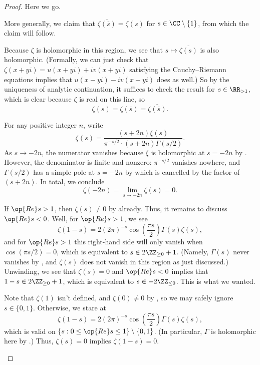 \documentclass[../notes.tex]{subfiles}
\begin{document}
\begin{proof}
	Here we go.
	\begin{listalph}
		\item More generally, we claim that $\overline{\zeta(\overline s)}=\zeta(s)$ for $s\in\CC\setminus\{1\}$, from which the claim will follow.
		
		Because $\zeta$ is holomorphic in this region, we see that $s\mapsto\overline{\zeta(s)}$ is also holomorphic. (Formally, we can just check that $\zeta(x+yi)=u(x+yi)+iv(x+yi)$ satisfying the Cauchy--Riemann equations implies that $u(x-yi)-iv(x-yi)$ does as well.) So by the uniqueness of analytic continuation, it suffices to check the result for $s\in\RR_{>1}$, which is clear because $\zeta$ is real on this line, so
		\[\zeta(s)=\zeta(\overline s)=\overline{\zeta(\overline s)}.\]

		\item For any positive integer $n$, write
		\[\zeta(s)=\frac{(s+2n)\xi(s)}{\pi^{-s/2}\cdot(s+2n)\Gamma(s/2)}.\]
		As $s\to-2n$, the numerator vanishes because $\xi$ is holomorphic at $s=-2n$ by . However, the denominator is finite and nonzero: $\pi^{-s/2}$ vanishes nowhere, and $\Gamma(s/2)$ has a simple pole at $s=-2n$ by  which is cancelled by the factor of $(s+2n)$. In total, we conclude
		\[\zeta(-2n)=\lim_{s\to-2n}\zeta(s)=0.\]

		\item If $\op{Re}s>1$, then $\zeta(s)\ne0$ by  already. Thus, it remains to discuss $\op{Re}s<0$. Well, for $\op{Re}s>1$, we see
		\[\zeta(1-s)=2(2\pi)^{-s}\cos\left(\frac{\pi s}2\right)\Gamma(s)\zeta(s),\]
		and for $\op{Re}s>1$ this right-hand side will only vanish when $\cos(\pi s/2)=0$, which is equivalent to $s\in2\ZZ_{\ge0}+1$. (Namely, $\Gamma(s)$ never vanishes by , and $\zeta(s)$ does not vanish in this region as just discussed.) Unwinding, we see that $\zeta(s)=0$ and $\op{Re}s<0$ implies that $1-s\in2\ZZ_{\ge0}+1$, which is equivalent to $s\in-2\ZZ_{\le0}$. This is what we wanted.

		\item Note that $\zeta(1)$ isn't defined, and $\zeta(0)\ne0$ by , so we may safely ignore $s\in\{0,1\}$. Otherwise, we stare at
		\[\zeta(1-s)=2(2\pi)^{-s}\cos\left(\frac{\pi s}2\right)\Gamma(s)\zeta(s),\]
		which is valid on $\{s:0\le\op{Re}s\le1\}\setminus\{0,1\}$. (In particular, $\Gamma$ is holomorphic here by .) Thus, $\zeta(s)=0$ implies $\zeta(1-s)=0$.
		\qedhere
	\end{listalph}
\end{proof}
\end{document}
